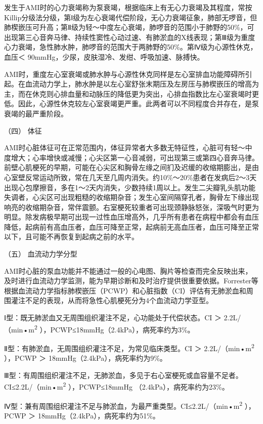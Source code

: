 发生于AMI时的心力衰竭称为泵衰竭，根据临床上有无心力衰竭及其程度，常按Killip分级法分级，第Ⅰ级为左心衰竭代偿阶段，无心力衰竭征象，肺部无啰音，但肺楔嵌压可升高；第Ⅱ级为轻～中度左心衰竭，肺啰音的范围小于肺野的50\%，可出现第三心音奔马律、持续性窦性心动过速、有肺淤血的X线表现；第Ⅲ级为重度心力衰竭，急性肺水肿，肺啰音的范围大于两肺野的50\%。第Ⅳ级为心源性休克，血压＜
90mmHg，少尿，皮肤湿冷、发绀、呼吸加速、脉搏快。

AMI时，重度左心室衰竭或肺水肿与心源性休克同样是左心室排血功能障碍所引起。在血流动力学上，肺水肿是以左心室舒张末期压及左房压与肺楔嵌压的增高为主，而在休克则心排血量和动脉压的降低更为突出，心排血指数比左心室衰竭时更低。因此，心源性休克较左心室衰竭更严重。此两者可以不同程度合并存在，是泵衰竭的最严重阶段。

\hypertarget{text00312.htmlux5cux23CHP10-8-2-2-1-4}{}
（四） 体征

AMI时心脏体征可在正常范围内，体征异常者大多数无特征性，心脏可有轻～中度增大；心率增快或减慢；心尖区第一心音减弱，可出现第三或第四心音奔马律。前壁心肌梗死的早期，可能在心尖区和胸骨左缘之间扪及迟缓的收缩期膨出，是由心室壁反常运动所致，常在几天至几周内消失。约10\%～20\%患者在发病后2～3天出现心包摩擦音，多在1～2天内消失，少数持续1周以上。发生二尖瓣乳头肌功能失调者，心尖区可出现粗糙的收缩期杂音；发生心室间隔穿孔者，胸骨左下缘出现响亮的收缩期杂音，常伴震颤。右室梗死较重者可出现颈静脉怒张，深吸气时更为明显。除发病极早期可出现一过性血压增高外，几乎所有患者在病程中都会有血压降低，起病前有高血压者，血压可降至正常，起病前无高血压者，血压可降至正常以下，且可能不再恢复到起病之前的水平。

\hypertarget{text00312.htmlux5cux23CHP10-8-2-2-1-5}{}
（五） 血流动力学分型

AMI时心脏的泵血功能并不能通过一般的心电图、胸片等检查而完全反映出来，及时进行血流动力学监测，能为早期诊断和及时治疗提供很重要依据。Forrester等根据血流动力学指标肺楔嵌压（PCWP）和心脏指数（CI）评估有无肺淤血和周围灌注不足的表现，从而将急性心肌梗死分为4个血流动力学亚型。

Ⅰ型：既无肺淤血又无周围组织灌注不足，心功能处于代偿状态。CI ＞
2.2L/（min•m\textsuperscript{2}
），PCWP≤18mmHg（2.4kPa），病死率约为3\%。

Ⅱ型：有肺淤血，无周围组织灌注不足，为常见临床类型。CI ＞
2.2L/（min•m\textsuperscript{2} ），PCWP ＞
18mmHg（2.4kPa），病死率约为9\%。

Ⅲ型：有周围组织灌注不足，无肺淤血，多见于右心室梗死或血容量不足者。CI≤2.2L/（min•m\textsuperscript{2}
），PCWP≤18mmHg （2.4kPa），病死率约为23\%。

Ⅳ型：兼有周围组织灌注不足与肺淤血，为最严重类型。CI≤2.2L/（min•m\textsuperscript{2}
），PCWP ＞ 18mmHg（2.4kPa），病死率约为51\%。

